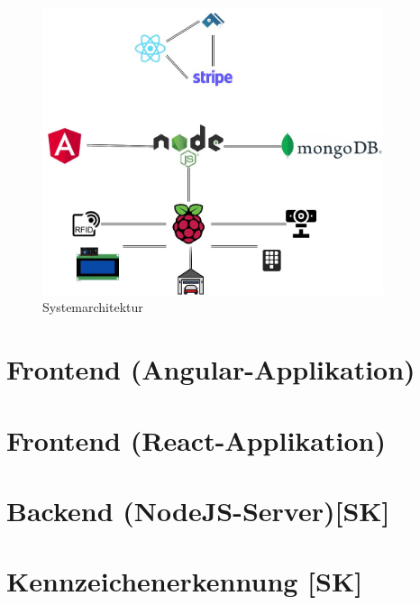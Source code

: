 \begin{figure}[h]
    \centering
    \includegraphics[width=10cm]{pics/APERTASystemarchitektur.jpg}
    \caption{Systemarchitektur}
    \end{figure}


\section{Frontend (Angular-Applikation)}

\section{Frontend (React-Applikation)}

\section{Backend (NodeJS-Server)[SK]}

\section{Kennzeichenerkennung [SK]}
